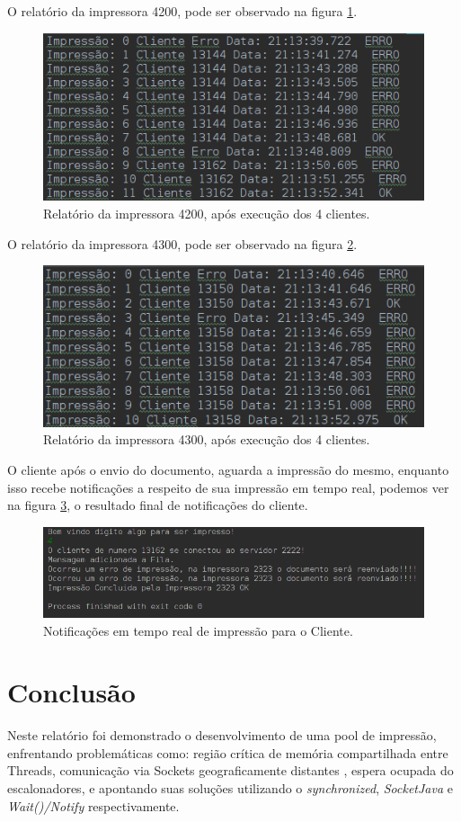 \documentclass[12pt]{article}
\begin{document}
 
 O relatório da impressora 4200, pode ser observado na figura \ref{fig:screenshot010}.

 \begin{figure}[H]
 	\centering
 	\includegraphics[width=0.7\linewidth]{imagens/screenshot013}
 	\caption{Relatório da impressora 4200, após execução dos 4 clientes.}
 	\label{fig:screenshot010}
 \end{figure}
 
  O relatório da impressora 4300, pode ser observado na figura \ref{fig:screenshot012}.
  \begin{figure}[H]
  	\centering
  	\includegraphics[width=0.7\linewidth]{imagens/screenshot012}
  	\caption{Relatório da impressora 4300, após execução dos 4 clientes.}
  	\label{fig:screenshot012}
  \end{figure}
  
  O cliente após  o envio do documento, aguarda a impressão do mesmo, enquanto isso recebe notificações  a respeito de sua impressão em tempo real, podemos ver  na figura  \ref{fig:screenshot015}, o resultado final de notificações do cliente.
  
  \begin{figure}[H]
  	\centering
  	\includegraphics[width=0.7\linewidth]{imagens/screenshot015}
  	\caption{Notificações em tempo real de impressão para o Cliente.}
  	\label{fig:screenshot015}
  \end{figure}
  
\section{Conclusão}

Neste relatório foi demonstrado o desenvolvimento de uma pool de impressão, enfrentando problemáticas como: região crítica de memória compartilhada entre Threads, comunicação via Sockets geograficamente distantes , espera ocupada do escalonadores, e apontando suas soluções utilizando  o \textit{synchronized}, \textit{SocketJava} e \textit{Wait()/Notify} respectivamente.




\end{document}
